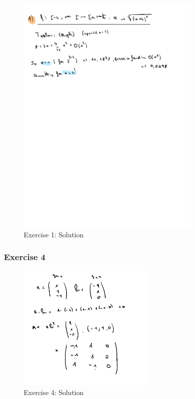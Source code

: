 \documentclass[a4paper]{report}
\begin{document}
\begin{figure}[H]
	\centering
	\includegraphics[width=0.8\textwidth]{./assets/thuis_1_ex_1.pdf}
	\caption{Exercise 1: Solution}
\end{figure}

\subsubsection{Exercise 4}

\begin{figure}[H]
	\centering
	\includegraphics[width=0.6\textwidth]{assets/huis_1_ex_4.png}
	\caption{Exercise 4: Solution}
	\label{fig:huis_1_ex_4}
\end{figure}
\end{document}
